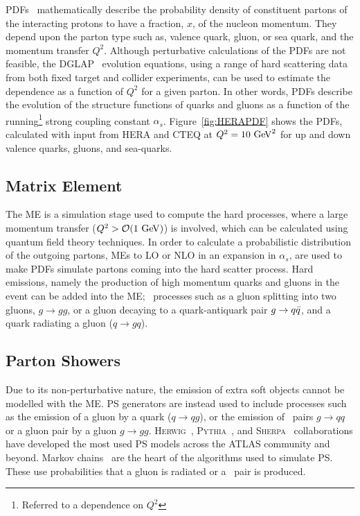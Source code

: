 			\acp{PDF}~\cite{Campbell2007} mathematically describe the probability density of constituent partons of the interacting protons to have a fraction, $x$, of the nucleon momentum. They depend upon the parton type such as, valence quark, gluon, or sea quark, and the momentum transfer $Q^2$. Although perturbative calculations of the \acp{PDF} are not feasible, the \textsc{DGLAP}~\cite{Gribov:1972ri, Altarelli:1977zs} evolution equations, using a range of hard scattering data from both fixed target and collider experiments, can be used to estimate the dependence as a function of $Q^2$ for a given parton. In other words, \acp{PDF} describe the evolution of the structure functions of quarks and gluons as a function of the running\footnote{Referred to a dependence on $Q^2$} strong coupling constant $\alpha_s$. Figure~\ref{fig:HERAPDF} shows the \acp{PDF}, calculated with input from \textsc{HERA} and \textsc{CTEQ} at $Q^2 = 10 \GeV^2$ for up and down valence quarks, gluons, and sea-quarks.



		\subsection*{Matrix Element}

			The \ac{ME} is a simulation stage used to compute the hard processes, where a large momentum transfer ($Q^2 > \mathcal{O}(1 \GeV)$) is involved, which can be calculated using quantum field theory techniques. In order to calculate a probabilistic distribution of the outgoing partons, \acp{ME} to \ac{LO} or \ac{NLO} in an expansion in $\alpha_s$, are used to make \acp{PDF} simulate partons coming into the hard scatter process. Hard emissions, namely the production of high momentum quarks and gluons in the event can be added into the \ac{ME}; \eg\ processes such as a gluon splitting into two gluons, $g \to gg$, or a gluon decaying to a quark-antiquark pair $g \rightarrow q\bar{q}$, and a quark radiating a gluon ($q \to gq$).

		\subsection*{Parton Showers}

			Due to its non-perturbative nature, the emission of extra soft objects cannot be modelled with the \ac{ME}. \ac{PS} generators are instead used to include processes such as the emission of a gluon by a quark ($q \to qg$), or the emission of \qqbar\ pairs $g \to qq$ or a gluon pair by a gluon $g \to gg$. \textsc{Herwig}~\cite{Herwig2001}, \textsc{Pythia}~\cite{Pythia2006}, and \textsc{Sherpa}~\cite{Sherpa} collaborations have developed the most used \ac{PS} models across the \ac{ATLAS} community and beyond. Markov chains~\cite{Berg2004} are the heart of the algorithms used to simulate \ac{PS}. These use probabilities that a gluon is radiated or a \qqbar\ pair is produced. %

